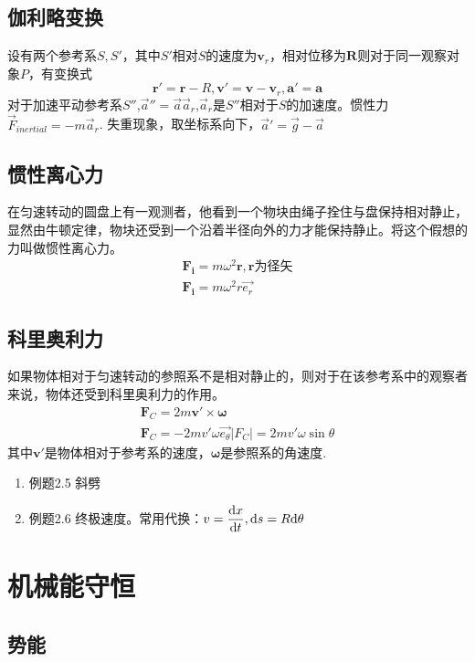 \subsection{伽利略变换}
设有两个参考系$S,S'$，其中$S'$相对$S$的速度为$\bm{v}_r$，相对位移为$\bm{R}$则对于同一观察对象$P$，有变换式
\begin{equation}\label{key}
	\bm{r}'=\bm{r}-R,\bm{v}'=\bm{v}-\bm{v}_r,\bm{a}'=\bm{a}
\end{equation}
对于加速平动参考系$S''$,$ \vec{a}''=\vec{a}\vec{a}_r $,$ \vec{a}_r $是$S''$相对于$ S $的加速度。惯性力$ \vec{F}_{inertial}=-m\vec{a}_r $.
失重现象，取坐标系向下，$ \vec{a}'=\vec{g}-\vec{a} $
\subsection{惯性离心力}
在匀速转动的圆盘上有一观测者，他看到一个物块由绳子拴住与盘保持相对静止，显然由牛顿定律，物块还受到一个沿着半径向外的力才能保持静止。将这个假想的力叫做惯性离心力。
\begin{align}\label{key}
	\bm{F_i}=m\omega^2 \bm{r} ,\bm{r}\text{为径矢}\\
	\bm{F_i}=m\omega^2 r\vec{e_r}
\end{align}
\subsection{科里奥利力}
如果物体相对于匀速转动的参照系不是相对静止的，则对于在该参考系中的观察者来说，物体还受到科里奥利力的作用。
\begin{align}\label{key}
	\bm{F}_C=2m\bm{v}'\times \bm{\omega}\\
	\bm{F}_C=-2mv'\omega \vec{e_\theta}
	|F_C|=2mv'\omega \sin \theta
\end{align}
其中$\bm{v}'$是物体相对于参考系的速度，$\bm{\omega}$是参照系的角速度.

\begin{enumerate}
	\item 例题2.5 斜劈
	\item 例题2.6 终极速度。常用代换：$ v=\dfrac{\mathrm{d} x}{\mathrm{d} t},\mathrm{d} s =R\mathrm{d} \theta $
\end{enumerate} 
\section{机械能守恒}
\subsection{势能}
